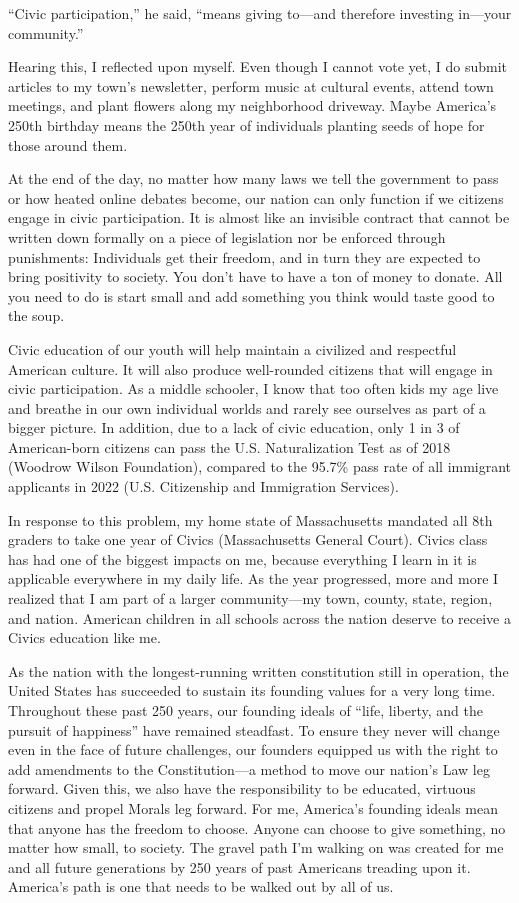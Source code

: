 \documentclass[12pt]{article}
\begin{document}
``Civic participation,'' he said, ``means giving to---and therefore investing in---your community.''

Hearing this, I reflected upon myself. Even though I cannot vote yet, I do submit articles to my town's newsletter, perform music at cultural events, attend town meetings, and plant flowers along my neighborhood driveway. Maybe America's 250th birthday means the 250th year of individuals planting seeds of hope for those around them.

At the end of the day, no matter how many laws we tell the government to pass or how heated online debates become, our nation can only function if we citizens engage in civic participation. It is almost like an invisible contract that cannot be written down formally on a piece of legislation nor be enforced through punishments: Individuals get their freedom, and in turn they are expected to bring positivity to society. You don't have to have a ton of money to donate. All you need to do is start small and add something you think would taste good to the soup.

Civic education of our youth will help maintain a civilized and respectful American culture. It will also produce well-rounded citizens that will engage in civic participation. As a middle schooler, I know that too often kids my age live and breathe in our own individual worlds and rarely see ourselves as part of a bigger picture. In addition, due to a lack of civic education, only 1 in 3 of American-born citizens can pass the U.S. Naturalization Test as of 2018 (Woodrow Wilson Foundation), compared to the 95.7\% pass rate of all immigrant applicants in 2022 (U.S. Citizenship and Immigration Services).

In response to this problem, my home state of Massachusetts mandated all 8th graders to take one year of Civics (Massachusetts General Court). Civics class has had one of the biggest impacts on me, because everything I learn in it is applicable everywhere in my daily life. As the year progressed, more and more I realized that I am part of a larger community---my town, county, state, region, and nation. American children in all schools across the nation deserve to receive a Civics education like me.

As the nation with the longest-running written constitution still in operation, the United States has succeeded to sustain its founding values for a very long time. Throughout these past 250 years, our founding ideals of ``life, liberty, and the pursuit of happiness'' have remained steadfast. To ensure they never will change even in the face of future challenges, our founders equipped us with the right to add amendments to the Constitution---a method to move our nation's Law leg forward. Given this, we also have the responsibility to be educated, virtuous citizens and propel Morals leg forward. For me, America's founding ideals mean that anyone has the freedom to choose. Anyone can choose to give something, no matter how small, to society. The gravel path I'm walking on was created for me and all future generations by 250 years of past Americans treading upon it. America's path is one that needs to be walked out by all of us.
\end{document}
